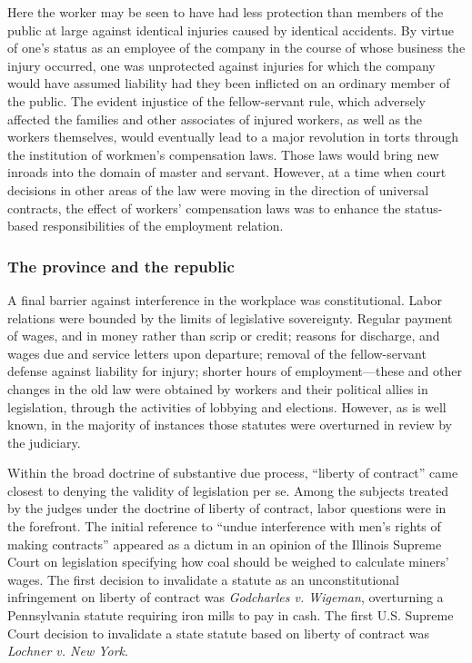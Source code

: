 \documentclass[
  letterpaper,
  11pt,
  DIV=9,
  openright]{scrbook}
\begin{document}
Here the worker may be seen to have had less protection than members of
the public at large against identical injuries caused by identical
accidents. By virtue of one's status as an employee of the company in
the course of whose business the injury occurred, one was unprotected
against injuries for which the company would have assumed liability had
they been inflicted on an ordinary member of the public. The evident
injustice of the fellow-servant rule, which adversely affected the
families and other associates of injured workers, as well as the workers
themselves, would eventually lead to a major revolution in torts through
the institution of workmen's compensation laws. Those laws would bring
new inroads into the domain of master and servant. However, at a time
when court decisions in other areas of the law were moving in the
direction of universal contracts, the effect of workers' compensation
laws was to enhance the status-based responsibilities of the employment
relation.

\subsubsection{The province and the
republic}\label{the-province-and-the-republic}

A final barrier against interference in the workplace was
constitutional. Labor relations were bounded by the limits of
legislative sovereignty. Regular payment of wages, and in money rather
than scrip or credit; reasons for discharge, and wages due and service
letters upon departure; removal of the fellow-servant defense against
liability for injury; shorter hours of employment---these and other
changes in the old law were obtained by workers and their political
allies in legislation, through the activities of lobbying and elections.
However, as is well known, in the majority of instances those statutes
were overturned in review by the judiciary.

Within the broad doctrine of substantive due process, ``liberty of
contract'' came closest to denying the validity of legislation per se.
Among the subjects treated by the judges under the doctrine of liberty
of contract, labor questions were in the forefront. The initial
reference to ``undue interference with men's rights of making
contracts'' appeared as a dictum in an opinion of the Illinois Supreme
Court on legislation specifying how coal should be weighed to calculate
miners' wages. The first decision to invalidate a statute as an
unconstitutional infringement on liberty of contract was
\emph{Godcharles v. Wigeman}, overturning a Pennsylvania statute
requiring iron mills to pay in cash. The first U.S. Supreme Court
decision to invalidate a state statute based on liberty of contract was
\emph{Lochner v. New York}.
\end{document}
